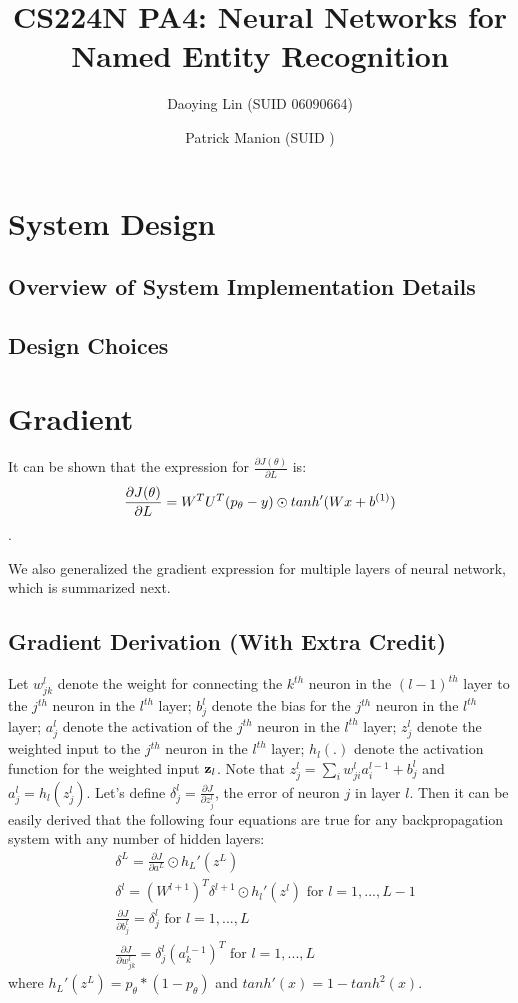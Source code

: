 \documentclass[11pt, oneside]{article}   	%
\title{CS224N PA4: Neural Networks for Named Entity Recognition}
\author{
	Daoying Lin (SUID 06090664)\\
	\and
	Patrick Manion (SUID )
}
\date{}							%
\begin{document}
\maketitle

\section{System Design}
\subsection{Overview of System Implementation Details}
\subsection{Design Choices}




\section{Gradient}
It can be shown that the expression for $\frac{\partial J(\theta)}{\partial L}$ is:
\[
\frac{\partial J(\theta)}{\partial L}
= W^T U^T (p_{\theta} - y) \odot tanh'(Wx + b^{(1)})  \\
\].

We also generalized the gradient expression for multiple layers of neural network, which is summarized next. 

\subsection{Gradient Derivation (With Extra Credit)}

Let $w_{jk}^l$ denote the weight for connecting the $k^{th}$ neuron in the $(l-1)^{th}$ layer to the $j^{th}$ neuron in the $l^{th}$ layer; $b_j^l$ denote the bias for the $j^{th}$ neuron in the $l^{th}$ layer; $a_j^l$ denote the activation of the $j^{th}$ neuron in the $l^{th}$ layer; $z_j^l$ denote the weighted input to the $j^{th}$ neuron in the $l^{th}$ layer; $h_l(.)$ denote the activation function for the weighted input $\bold{z}_l$.  Note that $z_j^l = \sum_{i} w_{ji}^l a_i^{l-1} + b_j^l$ and $a_j^l = h_l(z_j^l)$. Let's define $\delta_j^l = \frac{\partial J}{\partial z_j^l}$, the error of neuron $j$ in layer $l$. Then it can be easily derived that the following four equations are true for any backpropagation system with any number of hidden layers:
\begin{subequations}
\begin{align}
& \delta^L = \frac{\partial J}{ \partial a^L} \odot h_L'(z^L) \\
& \delta^l  = (W^{l+1})^T \delta^{l+1} \odot h_l'(z^l)   \text{   for $l = 1, ..., L-1$} \\
& \frac{\partial J}{ \partial b_j^l}   = \delta_j^l  \text{   for $l = 1, ..., L$}  \\
& \frac{\partial J}{\partial w^l_{jk}} = \delta_j^l  (a_k^{l-1})^T  \text{   for $l = 1, ..., L$} 
\end{align}
\end{subequations}
where $h_L'(z^L) = p_{\theta} * (1 - p_{\theta})$ and $tanh'(x) = 1 - tanh^2(x)$.
\end{document}
